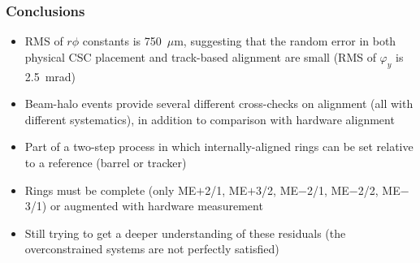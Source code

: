 \documentclass[compress]{beamer}
\begin{document}
\begin{frame}
\frametitle{Conclusions}

\begin{itemize}\setlength{\itemsep}{0.35 cm}
\item RMS of $r\phi$ constants is 750~$\mu$m, suggesting that the
  random error in both physical CSC placement and track-based
  alignment are small (RMS of $\varphi_y$ is 2.5~mrad)

\item Beam-halo events provide several different cross-checks on
  alignment (all with different systematics), in addition to
  comparison with hardware alignment

\item Part of a two-step process in which internally-aligned rings can
  be set relative to a reference (barrel or tracker)

\item Rings must be complete (only ME$+$2/1, ME$+$3/2, ME$-$2/1, ME$-$2/2,
  ME$-$3/1) or augmented with hardware measurement

\item Still trying to get a deeper understanding of these residuals
  (the overconstrained systems are not perfectly satisfied)
\end{itemize}

\label{numpages}
\end{frame}
\end{document}
